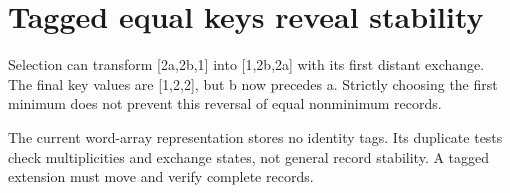 \section{Tagged equal keys reveal
  stability}\label{009-sorting-visualizer-x-stability-tagged-equal-keys-reveal-stability}

Selection can transform {[}2a,2b,1{]} into {[}1,2b,2a{]} with its first
distant exchange. The final key values are {[}1,2,2{]}, but b now
precedes a. Strictly choosing the first minimum does not prevent this
reversal of equal nonminimum records.

The current word-array representation stores no identity tags. Its
duplicate tests check multiplicities and exchange states, not general
record stability. A tagged extension must move and verify complete
records.
